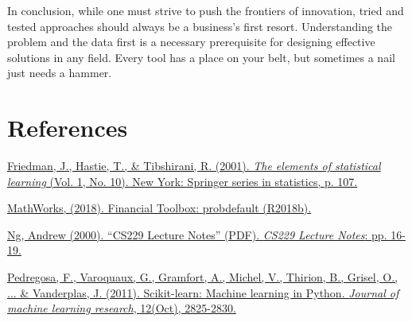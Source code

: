 \documentclass[twocolumn]{article}
\begin{document}
In conclusion, while one must strive to push the frontiers of innovation, tried and tested approaches should always be a business's first resort. Understanding the problem and the data first is a necessary prerequisite for designing effective solutions in any field. Every tool has a place on your belt, but sometimes a nail just needs a hammer. 

\section*{References}


\href{https://web.stanford.edu/~hastie/ElemStatLearn/printings/ESLII_print12.pdf}{Friedman, J., Hastie, T., \& Tibshirani, R. (2001). \textsl{The elements of statistical learning} (Vol. 1, No. 10). New York: Springer series in statistics, p. 107.}


\href{https://www.mathworks.com/help/finance/creditscorecard.probdefault.html}{MathWorks, (2018). Financial Toolbox: probdefault (R2018b).}


\href{http://akademik.bahcesehir.edu.tr/~tevfik/courses/cmp5101/cs229-notes1.pdf}{Ng, Andrew (2000). ``CS229 Lecture Notes'' (PDF). \textsl{CS229 Lecture Notes}: pp. 16-19. }

\href{http://www.jmlr.org/papers/v12/pedregosa11a.html}{Pedregosa, F., Varoquaux, G., Gramfort, A., Michel, V., Thirion, B., Grisel, O., ... \& Vanderplas, J. (2011). Scikit-learn: Machine learning in Python. \textsl{Journal of machine learning research}, 12(Oct), 2825-2830.}
\end{document}
